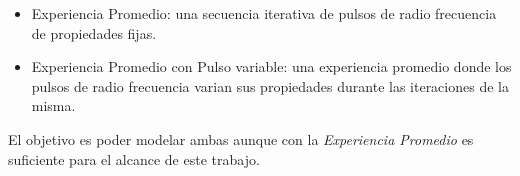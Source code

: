 \begin{itemize}
    \item Experiencia Promedio: una secuencia iterativa de 
    pulsos de radio frecuencia de propiedades fijas.

    \item Experiencia Promedio con Pulso variable: una 
    experiencia promedio donde los pulsos de radio frecuencia 
    varian sus propiedades durante las iteraciones de la misma.

\end{itemize}

El objetivo es poder modelar ambas aunque con la \textit{Experiencia Promedio} es 
suficiente para el alcance de este trabajo.


\newpage